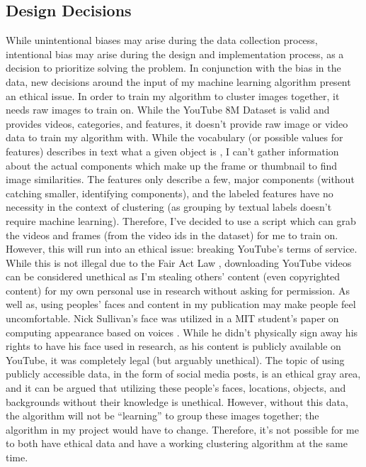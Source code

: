 \documentclass[10pt,twocolumn]{article}
\begin{document}
\subsection {Design Decisions}

While unintentional biases may arise during the data collection process, intentional bias may arise during the design and implementation process, as a decision to prioritize solving the problem. In conjunction with the bias in the data, new decisions around the input of my machine learning algorithm present an ethical issue. In order to train my algorithm to cluster images together, it needs raw images to train on. While the YouTube 8M Dataset is valid and provides videos, categories, and features, it doesn’t provide raw image or video data to train my algorithm with. While the vocabulary (or possible values for features) describes in text what a given object is \cite{googleYT8M}, I can’t gather information about the actual components which make up the frame or thumbnail to find image similarities. The features only describe a few, major components (without catching smaller, identifying components), and the labeled features have no necessity in the context of clustering (as grouping by textual labels doesn’t require machine learning). Therefore, I’ve decided to use a script which can grab the videos and frames (from the video ids in the dataset) for me to train on. However, this will run into an ethical issue: breaking YouTube’s terms of service. While this is not illegal due to the Fair Act Law \cite{YTFairUse}, downloading YouTube videos can be considered unethical as I’m stealing others’ content (even copyrighted content) for my own personal use in research without asking for permission. As well as, using peoples’ faces and content in my publication may make people feel uncomfortable. Nick Sullivan’s face was utilized in a MIT student’s paper on computing appearance based on voices \cite{Hu2019}. While he didn’t physically sign away his rights to have his face used in research, as his content is publicly available on YouTube, it was completely legal (but arguably unethical). The topic of using publicly accessible data, in the form of social media posts, is an ethical gray area, and it can be argued that utilizing these people’s faces, locations, objects, and backgrounds without their knowledge is unethical. However, without this data, the algorithm will not be “learning” to group these images together; the algorithm in my project would have to change. Therefore, it’s not possible for me to both have ethical data and have a working clustering algorithm at the same time.
\end{document}
